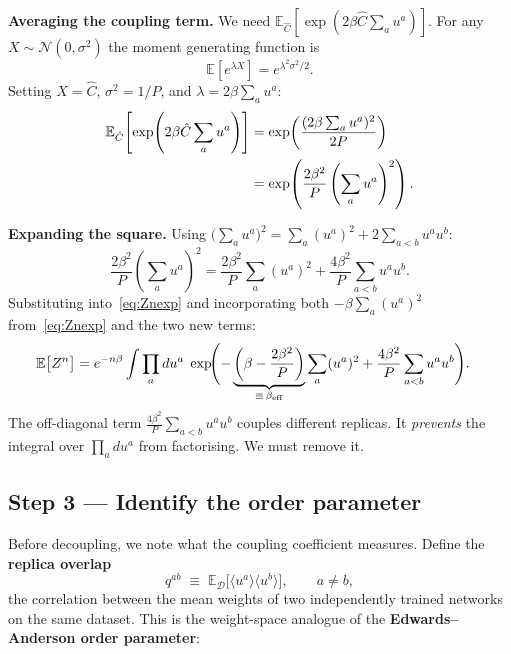 \documentclass[nobib,justified]{tufte-handout}
\newcommand{\EE}{\mathbb{E}}
\newcommand{\cD}{\mathcal{D}}
\begin{document}
\noindent\textbf{Averaging the coupling term.}
We need $\EE_{\hat{C}}\!\left[\exp(2\beta\hat{C}\sum_a u^a)\right]$.
For any $X\sim\mathcal{N}(0,\sigma^2)$ the moment generating function is
\begin{equation}
  \EE\!\left[e^{\lambda X}\right] = e^{\lambda^2\sigma^2/2}.
  \label{eq:mgf}
\end{equation}
Setting $X=\hat{C}$, $\sigma^2 = 1/P$, and $\lambda = 2\beta\sum_a u^a$:
\begin{align}
  \EE_{\hat{C}}\!\left[\exp\!\left(2\beta\hat{C}\sum_a u^a\right)\right]
  &= \exp\!\left(\frac{(2\beta\sum_a u^a)^2}{2P}\right) \notag\\
  &= \exp\!\left(\frac{2\beta^2}{P}\left(\sum_a u^a\right)^2\right).
  \label{eq:mgfresult}
\end{align}

\noindent\textbf{Expanding the square.}  Using
$\bigl(\sum_a u^a\bigr)^2 = \sum_a(u^a)^2 + 2\sum_{a<b}u^a u^b$:
\begin{equation}
  \frac{2\beta^2}{P}\left(\sum_a u^a\right)^2
  = \frac{2\beta^2}{P}\sum_a(u^a)^2
    + \frac{4\beta^2}{P}\sum_{a<b}u^a u^b.
  \label{eq:sqexpand}
\end{equation}
Substituting into~\eqref{eq:Znexp} and incorporating both
$-\beta\sum_a(u^a)^2$ from~\eqref{eq:Znexp} and the two new terms:
\begin{align}
  \EE\bigl[Z^n\bigr]
  &= e^{-n\beta}
    \int\prod_a du^a\;
    \exp\!\Biggl(
      -\underbrace{\left(\beta - \frac{2\beta^2}{P}\right)}_{\equiv\,\beta_{\rm eff}}
      \sum_a(u^a)^2
      + \frac{4\beta^2}{P}\sum_{a<b}u^a u^b
    \Biggr).
  \label{eq:EZn}
\end{align}
The off-diagonal term $\frac{4\beta^2}{P}\sum_{a<b}u^a u^b$ couples
different replicas.  It \emph{prevents} the integral over
$\prod_a du^a$ from factorising.  We must remove it.

\subsection*{Step 3 --- Identify the order parameter}

Before decoupling, we note what the coupling coefficient measures.
Define the \textbf{replica overlap}
\begin{equation}
  q^{ab} \;\equiv\; \EE_{\cD}\bigl[\langle u^a\rangle\langle u^b\rangle\bigr],
  \qquad a\neq b,
  \label{eq:overlap}
\end{equation}
the correlation between the mean weights of two independently trained
networks on the same dataset.  This is the weight-space analogue of the
\textbf{Edwards--Anderson order parameter}:
\end{document}

